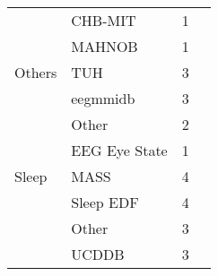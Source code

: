 \begin{tabular}{llrl}
      & CHB-MIT &            1 &                                                                                                                                                              \cite{Wen2018} \\
      & MAHNOB &            1 &                                                                                                                                                      \cite{drouin2016using} \\
Others & TUH &            3 &                                                                                                                              \cite{Schirrmeister2017a, Roy2018, Zhang2018a} \\
      & eegmmidb &            3 &                                                                                                                                   \cite{Zhang2018a, Zhang2017e, Zhang2017c} \\
      & Other &            2 &                                                                                                                                           \cite{VanPutten2018b, Zhang2018a} \\
      & EEG Eye State &            1 &                                                                                                                                                             \cite{Lee2018a} \\
Sleep & MASS &            4 &                                                                                                                   \cite{Phan2018, Chambon2018, Supratak2017, dong2018mixed} \\
      & Sleep EDF &            4 &                                                                                                                   \cite{Vilamala2017, Supratak2017, Xie2017, Tsinalis2016a} \\
      & Other &            3 &                                                                                                                                     \cite{Sors2018, Tripathy2018, Giri2016} \\
      & UCDDB &            3 &                                                                                                                           \cite{Langkvist2018, Manzano2017a, Langkvist2012} \\
\bottomrule
\end{tabular}
